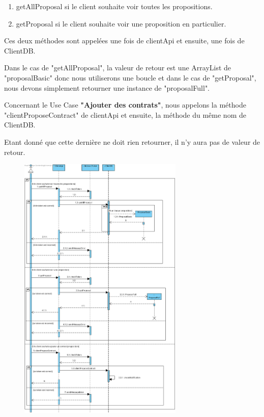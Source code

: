 \begin{enumerate}
\item getAllProposal si le client souhaite voir toutes les propositions.
\item getProposal si le client souhaite voir une proposition en particulier.
\end{enumerate}

\begin{flushleft}
Ces deux méthodes sont appelées une fois de clientApi et ensuite, une fois de ClientDB.
\end{flushleft}

\begin{flushleft}
Dans le cas de "getAllProposal", la valeur de retour est une ArrayList de "proposalBasic" donc nous utiliserons une boucle et dans le cas de "getProposal", nous devons simplement retourner une instance de "proposalFull".
\end{flushleft}

\begin{flushleft}
Concernant le Use Case \textbf{"Ajouter des contrats"}, nous appelons la méthode "clientProposeContract" de clientApi et ensuite, la méthode du même nom de ClientDB.
\end{flushleft}

\begin{flushleft}
Etant donné que cette dernière ne doit rien retourner, il n'y aura pas de valeur de retour.
\end{flushleft}

\newpage
\begin{figure}[h]
\centering
\includegraphics[width = 0.7\textwidth]{Base/sequence/img/client/Voir-les-fournisseurs-et-contrats-relatifs.png}
\end{figure}

